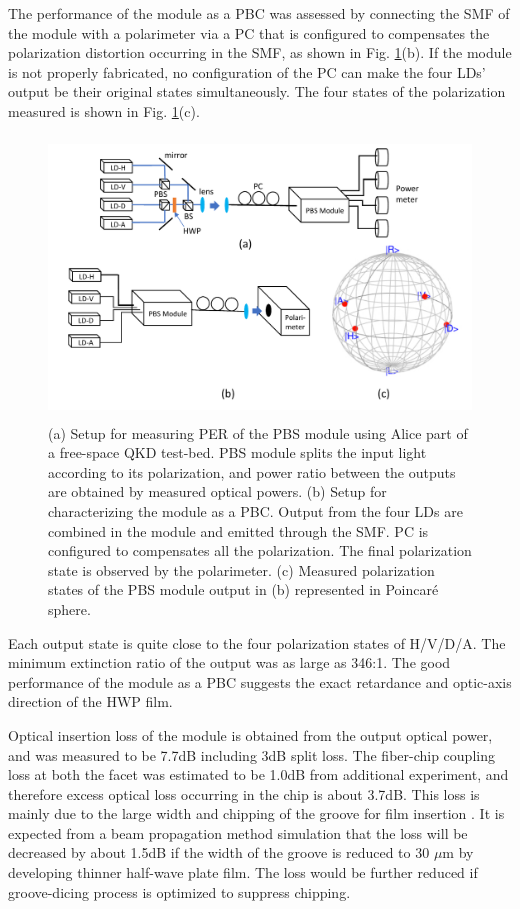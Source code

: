 \documentclass[letterpaper, 10pt]{article}
\begin{document}
The performance of the module as a PBC was assessed by connecting the SMF of the module with a polarimeter via a PC that is configured to compensates the polarization distortion occurring in the SMF, as shown in Fig. \ref{fig:meas_setup}(b).
If the module is not properly fabricated, no configuration of the PC can make the four LDs' output be their original states simultaneously.
The four states of the polarization measured is shown in Fig. \ref{fig:meas_setup}(c).
\begin{figure}
  \centering
  \includegraphics[height=7.5cm]{meas_setup}
  \caption{(a) Setup for measuring PER of the PBS module using Alice part of a free-space QKD test-bed. PBS module splits the input light according to its polarization, and power ratio between the outputs are obtained by measured optical powers.  (b) Setup for characterizing the module as a PBC. Output from the four LDs are combined in the module and emitted through the SMF. PC is configured to compensates all the polarization. The final polarization state  is observed by the polarimeter. (c) Measured polarization states of the PBS module output in (b) represented in Poincar\'{e} sphere.}
  \label{fig:meas_setup}
\end{figure}
Each output state is quite close to the four polarization states of H/V/D/A.
The minimum extinction ratio of the output was as large as 346:1.
The good performance of the module as a PBC suggests the exact retardance and optic-axis direction of the HWP film.



Optical insertion loss of the module is obtained  from the output optical power, and was measured to be 7.7dB including 3dB split loss.
The fiber-chip coupling loss at both the facet was estimated to be 1.0dB from additional experiment, and therefore excess optical loss occurring in the chip is about 3.7dB.
This loss is mainly due to the large width and chipping of the groove for film insertion \cite{Carpenter:2013fh}.
It is expected from a beam propagation method simulation that the loss will be decreased by about 1.5dB if the width of the groove is reduced to 30 $\mu$m by developing thinner half-wave plate film.
The loss would be further reduced if groove-dicing process is optimized to suppress chipping.
\end{document}
